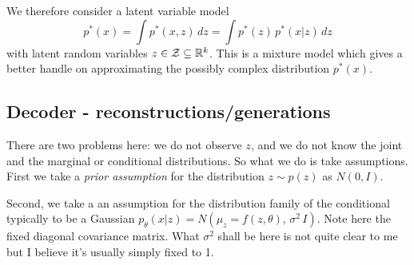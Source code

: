 We therefore consider a latent variable model
\begin{equation}\label{eq:vae_letentModel}
p^*(x) = \int p^*(x, z) \, dz  = \int p^*(z) \, p^*(x|z) \, dz 
\end{equation}
%
with latent random variables $z \in \mathcal{Z} \subseteq \mathbb{R}^k$.
This is a mixture model which gives a better handle on approximating the possibly complex distribution $p^*(x)$.

\subsection{Decoder - reconstructions/generations}\label{sec:Vae_decoder}

There are two problems here: we do not observe $z$, and we do not know the joint and the marginal or conditional distributions.
So what we do is take assumptions.
First we take a \emph{prior assumption} for the distribution $z \sim p(z)$ as $N(0,I)$.


Second, we take a an assumption for the distribution family of the conditional typically to be a Gaussian $p_{\theta}(x|z) =  N(\mu_z = f(z, \theta), \, \sigma^2 \, I)$. 
Note here the fixed diagonal covariance matrix.
What $\sigma^2$ shall be here is not quite clear to me but I believe it's usually simply fixed to 1.



